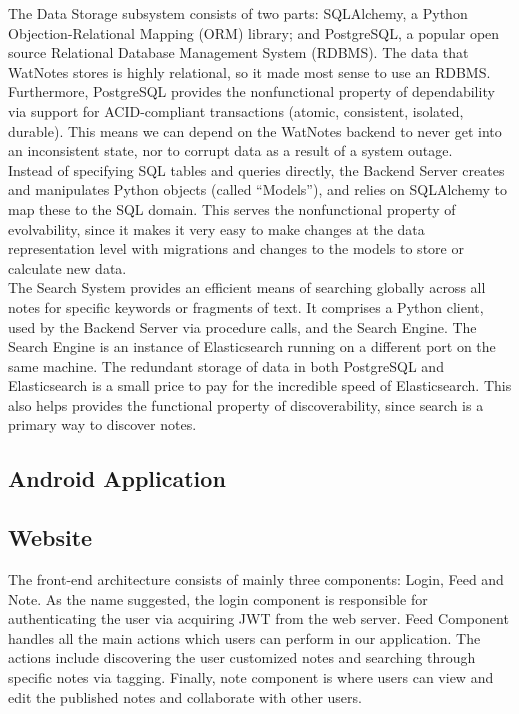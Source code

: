 \documentclass[12pt]{article}
\begin{document}
    The Data Storage subsystem consists of two parts: SQLAlchemy, a Python
    Objection-Relational Mapping (ORM) library; and PostgreSQL, a popular open
    source Relational Database Management System (RDBMS). The data that WatNotes
    stores is highly relational, so it made most sense to use an RDBMS.
    Furthermore, PostgreSQL provides the nonfunctional property of dependability
    via support for ACID-compliant transactions (atomic, consistent, isolated,
    durable). This means we can depend on the WatNotes backend to never get into
    an inconsistent state, nor to corrupt data as a result of a system outage.\\

    Instead of specifying SQL tables and queries directly, the Backend Server
    creates and manipulates Python objects (called ``Models''), and relies on
    SQLAlchemy to map these to the SQL domain. This serves the nonfunctional
    property of evolvability, since it makes it very easy to make changes at the
    data representation level with migrations and changes to the models to store
    or calculate new data.\\

    The Search System provides an efficient means of searching globally across
    all notes for specific keywords or fragments of text. It comprises a Python
    client, used by the Backend Server via procedure calls, and the Search
    Engine. The Search Engine is an instance of Elasticsearch running on a
    different port on the same machine. The redundant storage of data in both
    PostgreSQL and Elasticsearch is a small price to pay for the incredible
    speed of Elasticsearch. This also helps provides the functional property of
    discoverability, since search is a primary way to discover notes.

  \subsection{Android Application}
  \subsection{Website}

  The front-end architecture consists of mainly three components: Login, Feed and Note. As the name suggested, the login component is responsible for authenticating the user via acquiring JWT from the web server. Feed Component handles all the main actions which users can perform in our application. The actions include discovering the user customized notes and searching through specific notes via tagging. Finally, note component is where users can view and edit the published notes and collaborate with other users. \\
\end{document}
